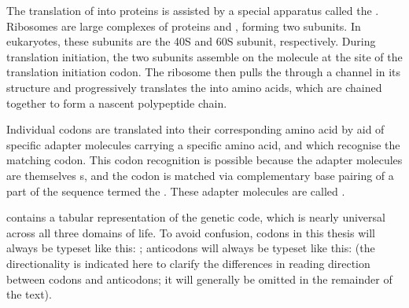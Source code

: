 The translation of \mrna into proteins is assisted by a special apparatus called
the . Ribosomes are large complexes of proteins and \rrna,
forming two subunits. In eukaryotes, these subunits are the 40S and 60S subunit,
respectively. During translation initiation, the two subunits assemble on the
\mrna molecule at the site of the translation initiation codon. The ribosome
then pulls the \mrna through a channel in its structure and progressively
translates the \mrna into amino acids, which are chained together to form a
nascent polypeptide chain.

Individual codons are translated into their corresponding amino acid by aid of
specific adapter molecules carrying a specific amino acid, and which recognise
the matching codon. This codon recognition is possible because the adapter
molecules are themselves s, and the codon is matched via complementary
base pairing of a part of the \rna sequence termed the . These
adapter molecules are called .

 contains a tabular representation of the genetic code,
which is nearly universal across all three domains of life. To avoid confusion,
codons in this thesis will always be typeset like this: ;
anticodons will always be typeset like this:  (the
directionality is indicated here to clarify the differences in reading direction
between codons and anticodons; it will generally be omitted in the remainder of
the text).

